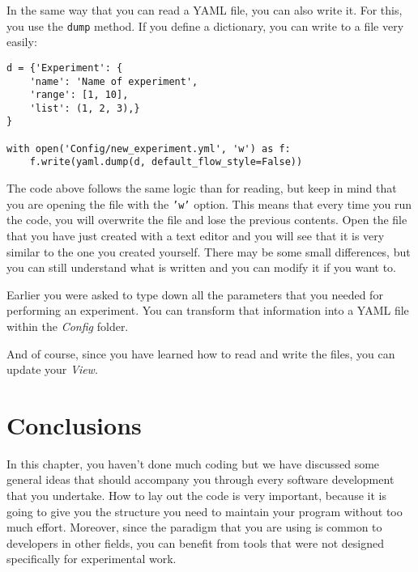 
In the same way that you can read a {YAML} file, you can also write it.
For this, you use the \texttt{dump} method. If you define a dictionary,
you can write to a file very easily:

\begin{verbatim}
d = {'Experiment': {
    'name': 'Name of experiment',
    'range': [1, 10],
    'list': (1, 2, 3),}
}

with open('Config/new_experiment.yml', 'w') as f:
    f.write(yaml.dump(d, default_flow_style=False))
\end{verbatim}

The code above follows the same logic than for reading, but keep in mind
that you are opening the file with the
\texttt{'w'} option. This means that
every time you run the code, you will overwrite the file and lose the
previous contents. Open the file that you have just created with a text
editor and you will see that it is very similar to the one you created
yourself. There may be some small differences, but you can still
understand what is written and you can modify it if you want to.


Earlier you were asked to type down all the parameters that you needed
for performing an experiment. You can transform that information into a
{YAML} file within the \emph{Config} folder.


And of course, since you have learned how to read and write the files,
you can update your \emph{View}.


\section{Conclusions}\label{conclusions}

In this chapter, you haven't done much coding but we have discussed some
general ideas that should accompany you through every software
development that you undertake. How to lay out the code is very
important, because it is going to give you the structure you need to
maintain your program without too much effort. Moreover, since the
paradigm that you are using is common to developers in other fields, you
can benefit from tools that were not designed specifically for
experimental work.

